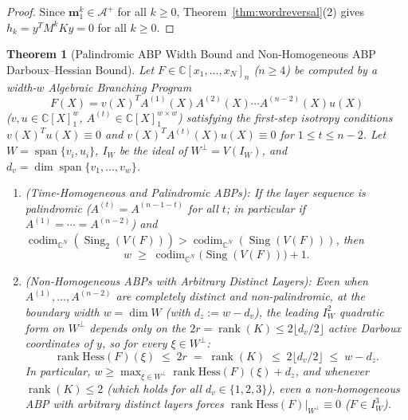 \documentclass[11pt,a4paper]{article}
\newtheorem{theorem}{Theorem}[section]
\theoremstyle{definition}
\DeclareMathOperator{\codim}{codim}
\DeclareMathOperator{\Sing}{Sing}
\DeclareMathOperator{\rank}{rank}
\DeclareMathOperator{\Span}{span}
\begin{document}
\begin{proof}
Since $\mathbf{m}_1^k \in \mathcal{A}^+$ for all $k \ge 0$, Theorem~\ref{thm:wordreversal}(2) gives $h_k = y^T M^k K y = 0$ for all $k \ge 0$.
\end{proof}

\begin{theorem}[Palindromic ABP Width Bound and Non-Homogeneous ABP Darboux--Hessian Bound]\label{thm:abp}
Let $F \in \mathbb{C}[x_1,\dots,x_N]_n$ ($n \ge 4$) be computed by a width-$w$ Algebraic Branching Program
\[
  F(X) = v(X)^T A^{(1)}(X) A^{(2)}(X) \cdots A^{(n-2)}(X) u(X)
\]
($v, u \in \mathbb{C}[X]_1^w$, $A^{(t)} \in \mathbb{C}[X]_1^{w \times w}$) satisfying the first-step isotropy conditions $v(X)^T u(X) \equiv 0$ and $v(X)^T A^{(t)}(X) u(X) \equiv 0$ for $1 \le t \le n-2$. Let $W = \Span\{v_i, u_i\}$, $I_W$ be the ideal of $W^\perp = V(I_W)$, and $d_v = \dim\Span\{v_1,\dots,v_w\}$.
\begin{enumerate}
  \item \emph{(Time-Homogeneous and Palindromic ABPs):} If the layer sequence is palindromic ($A^{(t)} = A^{(n-1-t)}$ for all $t$; in particular if $A^{(1)} = \cdots = A^{(n-2)}$) and $\codim_{\mathbb{C}^N}(\Sing_2(V(F))) > \codim_{\mathbb{C}^N}(\Sing(V(F)))$, then
  \[
    w \;\ge\; \codim_{\mathbb{C}^N}\big(\Sing(V(F))\big) + 1.
  \]
  \item \emph{(Non-Homogeneous ABPs with Arbitrary Distinct Layers):} Even when $A^{(1)}, \dots, A^{(n-2)}$ are completely distinct and non-palindromic, at the boundary width $w = \dim W$ (with $d_z := w - d_v$), the leading $I_W^2$ quadratic form on $W^\perp$ depends only on the $2r = \rank(K) \le 2\lfloor d_v/2 \rfloor$ active Darboux coordinates of $y$, so for every $\xi \in W^\perp$:
  \[
    \rank \mathrm{Hess}(F)(\xi) \;\le\; 2r \;=\; \rank(K) \;\le\; 2\lfloor d_v / 2 \rfloor \;\le\; w - d_z.
  \]
  In particular, $w \ge \max_{\xi \in W^\perp} \rank\mathrm{Hess}(F)(\xi) + d_z$, and whenever $\rank(K) \le 2$ (which holds for all $d_v \in \{1, 2, 3\}$), even a non-homogeneous ABP with arbitrary distinct layers forces $\rank\mathrm{Hess}(F)|_{W^\perp} \equiv 0$ ($F \in I_W^3$).
\end{enumerate}
\end{theorem}
\end{document}
